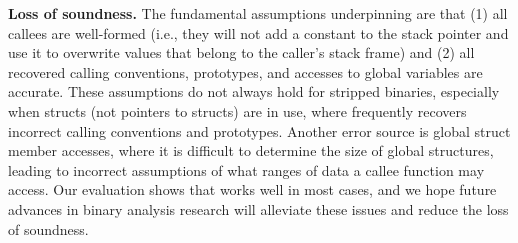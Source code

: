 \smallskip
\noindent
\textbf{Loss of soundness.}
The fundamental assumptions underpinning \assumed are that (1) all callees are well-formed (i.e., they will not add a constant to the stack pointer and use it to overwrite values that belong to the caller's stack frame) and (2) all recovered calling conventions, prototypes, and accesses to global variables are accurate.
These assumptions do not always hold for stripped binaries, especially when structs (not pointers to structs) are in use, where \rda frequently recovers incorrect calling conventions and prototypes.
Another error source is global struct member accesses, where it is difficult to determine the size of global structures, leading to incorrect assumptions of what ranges of data a callee function may access.
Our evaluation shows that \assumed works well in most cases, and we hope future advances in binary analysis research will alleviate these issues and reduce the loss of soundness.

